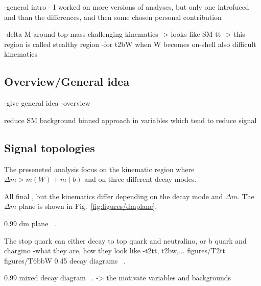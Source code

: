 -general intro
	- I worked on more versions of analyses, but only one introfuced and than the differences, and then some chosen personal contribution

-delta M around top mass challenging kinematics -> looks like SM tt -> this region is called stealthy region
-for t2bW when W becomes on-shell also difficult kinematics



\subsection{Overview/General idea}
-give general idea
	-overview

reduce SM background
binned approach in variables which tend to reduce signal

\subsection{Signal topologies}

The preseneted analysis focus on the kinematic region where $\Delta m > m(W)+m(b)$ and on three different decay modes.

All final , but the kinematics differ depending on the decay mode and $\Delta m$. The  $\Delta m$ plane is shown in Fig.~\ref{fig:figures/dmplane}.

                 {0.99}       %
                 { dm plane ~\cite{Aad:2014kra}. }


The stop quark can either decay to top quark and neutralino, or b quark and chargino
-what they are, how they look like
-t2tt, t2bw,...
                 {figures/T2tt} %
                 {figures/T6bbW} %
                 {0.45}       %
                 { decay diagrams ~\cite{website:SUSYdiagrams}. }

                 {0.99}       %
                 { mixed decay diagram ~\cite{website:SUSYdiagrams}. }
-> the motivate variables and backgrounds





